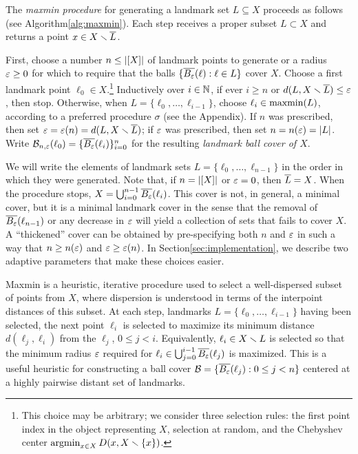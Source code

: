 \documentclass{article}
\begin{document}
The \emph{maxmin procedure} for generating a landmark set
\(L\subseteq X\) proceeds as follows (see
Algorithm\nbs\ref{alg:maxmin}). Each step receives a proper subset
\(L\subset X\) and returns a point \(x\in X\smallsetminus \overline{L}\).

First, choose a number \(n\leq\lvert [X]\rvert\) of landmark points to generate
or a radius \(\varepsilon\geq 0\) for which to require that the balls
\(\{ \overline{B_{\varepsilon}}(\ell) : \ell \in L \}\) cover \(X\). Choose a first
landmark point \(\ell_0\in X\).\footnote{This choice may be arbitrary;
  we consider three selection rules: the first point index in the object
  representing \(X\), selection at random, and the Chebyshev center
  \(\operatorname{argmin}_{x \in X}{ D(x, X \smallsetminus \{x\}) }\).} Inductively over
\(i\in\mathbb{N}\), if ever \(i\geq n\) or \(d(L,X\smallsetminus \overline{L})\leq\varepsilon\), then
stop. Otherwise, when \(L=\{\ell_0,\ldots,\ell_{i-1}\}\), choose
\(\ell_i\in\operatorname{maxmin}(L)\), according to a preferred procedure \(\sigma\)
(see the Appendix). If \(n\) was prescribed, then set
\(\varepsilon=\varepsilon(n)=d(L,X\smallsetminus \overline{L})\); if \(\varepsilon\) was prescribed, then set
\(n=n(\varepsilon)=\lvert L\rvert\). Write
\(\mathcal{B}_{n,\varepsilon}(\ell_0)=\{\overline{B_{\varepsilon}}(\ell_i)\}_{i=0}^{n}\) for
the resulting \emph{landmark ball cover of $X$}.

We will write the elements of landmark sets
\(L=\{\ell_0,\ldots,\ell_{n-1}\}\) in the order in which they were
generated. Note that, if \(n=\lvert [X]\rvert\) or \(\varepsilon=0\), then
\(\overline{L}=X\). When the procedure stops,
\(X=\bigcup_{i=0}^{n-1}{\overline{B_{\varepsilon}}(\ell_i)}\). This cover is not, in
general, a minimal cover, but it is a minimal landmark cover in the
sense that the removal of \(\overline{B_\varepsilon}(\ell_{n-1})\) or any decrease in
\(\varepsilon\) will yield a collection of sets that fails to cover \(X\). A
``thickened'' cover can be obtained by pre-specifying both \(n\) and
\(\varepsilon\) in such a way that \(n \geq n(\varepsilon)\) and
\(\varepsilon \geq \varepsilon(n)\). In Section\nbs\ref{sec:implementation}, we
describe two adaptive parameters that make these choices easier.

Maxmin is a heuristic, iterative procedure used to select a
well-dispersed subset of points from \(X\), where dispersion is
understood in terms of the interpoint distances of this subset. At each
step, landmarks \(L = \{\ell_0, \ldots, \ell_{i-1}\}\) having been
selected, the next point \(\ell_i\) is selected to maximize its minimum
distance \(d(\ell_j,\ell_i)\) from the \(\ell_j\), \(0 \leq j < i\).
Equivalently, \(\ell_i \in X \smallsetminus L\) is selected so that the minimum
radius \(\varepsilon\) required for
\(\ell_i \in \bigcup_{j=0}^{i-1}{\overline{B_\varepsilon}(\ell_j)}\) is maximized.
This is a useful heuristic for constructing a ball cover
\(\mathcal{B} = \{\overline{B_\varepsilon}(\ell_j) : 0 \leq j < n\}\) centered
at a highly pairwise distant set of landmarks.
\end{document}
